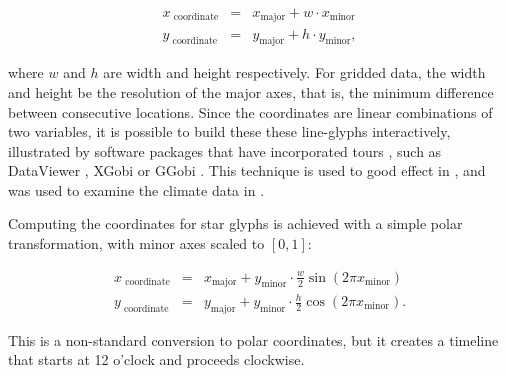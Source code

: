 \documentclass[oneside]{article}
\newcommand\amin{\text{minor}}
\newcommand\amaj{\text{major}}
\begin{document}
\begin{equation}
  \begin{array}{lll}
  x_\text{ coordinate}&=& x_{\amaj} + w \cdot x_{\amin}\\
  y_\text{ coordinate}&=& y_{\amaj} + h \cdot y_{\amin}, 
  \end{array}
  \label{coords.eqn}
\end{equation}

\noindent where $w$ and $h$ are width and height respectively. For gridded data, the width and height be the resolution of the major axes, that is, the minimum difference between consecutive locations. Since the coordinates are linear combinations of two variables, it is possible to build these these line-glyphs interactively, illustrated by software packages that have incorporated tours \citep{cook:2006}, such as DataViewer \citep{buja:1986}, XGobi \citep{swayne:1991} or GGobi \citep{swayne:2003}. This technique is used to good effect in \citet{buja:1996a}, and was used to examine the climate data in \citet{hobbs:2010}.

Computing the coordinates for star glyphs is achieved with a simple polar transformation, with minor axes scaled to $[0, 1]$: 

\begin{equation}
  \begin{array}{lll}
  x_\text{ coordinate}&=& x_{\amaj} + y_{\amin} \cdot \frac{w}{2} \sin(2 \pi x_{\amin}) \\
  y_\text{ coordinate}&=& y_{\amaj} + y_{\amin} \cdot \frac{h}{2} \cos(2 \pi x_{\amin}).
  \end{array}
  \label{coords.polar.eqn}
\end{equation}

\noindent This is a non-standard conversion to polar coordinates, but it creates a timeline that starts at 12 o'clock and proceeds clockwise.

%
% 
% 
%     
%   
\end{document}
